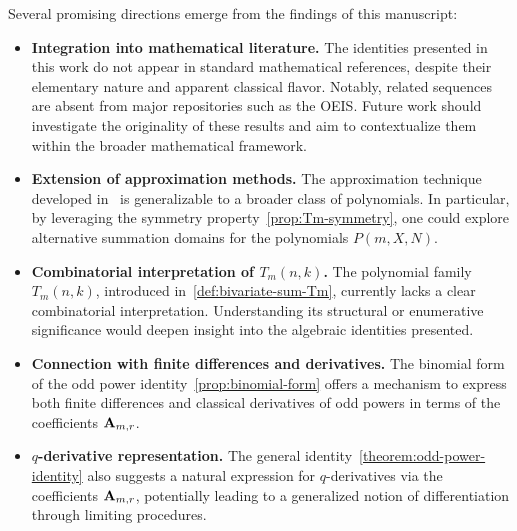 Several promising directions emerge from the findings of this manuscript:

\begin{itemize}
    \item \textbf{Integration into mathematical literature.}
    The identities presented in this work do not appear in standard mathematical references,
    despite their elementary nature and apparent classical flavor.
    Notably, related sequences are absent from major repositories such as the OEIS\@.
    Future work should investigate the originality of these results and aim to contextualize
    them within the broader mathematical framework.

    \item \textbf{Extension of approximation methods.}
    The approximation technique developed in~\cite{kolosov2025efficient} is generalizable
    to a broader class of polynomials.
    In particular, by leveraging the symmetry property~\eqref{prop:Tm-symmetry},
    one could explore alternative summation domains for the polynomials $P(m, X, N)$.

    \item \textbf{Combinatorial interpretation of $T_m(n,k)$.}
    The polynomial family $T_m(n,k)$, introduced in~\eqref{def:bivariate-sum-Tm},
    currently lacks a clear combinatorial interpretation.
    Understanding its structural or enumerative significance would deepen insight into
    the algebraic identities presented.

    \item \textbf{Connection with finite differences and derivatives.}
    The binomial form of the odd power identity~\eqref{prop:binomial-form} offers a mechanism
    to express both finite differences and classical derivatives of odd powers in terms
    of the coefficients ${\mathbf{A}} \sb{m,r}$.

    \item \textbf{$q$-derivative representation.}
    The general identity~\eqref{theorem:odd-power-identity} also suggests a natural
    expression for $q$-derivatives via the coefficients ${\mathbf{A}} \sb{m,r}$,
    potentially leading to a generalized notion of differentiation through limiting procedures.
\end{itemize}

